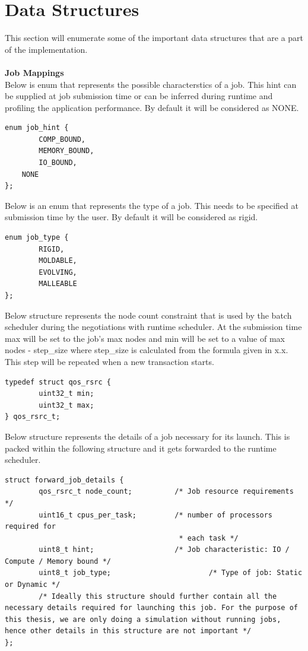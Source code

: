 \section{Data Structures}
This section will enumerate some of the important data structures that are a part of the implementation.\\ \\
\lstset{breaklines=true}
\textbf{Job Mappings}\\
Below is enum that represents the possible characterstics of a job. This hint can be supplied at job submission time or can be inferred during runtime and profiling the application performance. By default it will be considered as NONE.
\begin{lstlisting}[mathescape]
enum job_hint {
        COMP_BOUND,
        MEMORY_BOUND,
        IO_BOUND,
	NONE
};
\end{lstlisting}
Below is an enum that represents the type of a job. This needs to be specified at submission time by the user. By default it will be considered as rigid.
\begin{lstlisting}[mathescape]
enum job_type {
        RIGID,
        MOLDABLE,
        EVOLVING,
        MALLEABLE
};
\end{lstlisting}
Below structure represents the node count constraint that is used by the batch scheduler during the negotiations with runtime scheduler. At the submission time max will be set to the job's max nodes and min will be set to a value of max nodes - step\_size where step\_size is calculated from the formula given in x.x. This step will be repeated when a new transaction starts.
\begin{lstlisting}[mathescape]
typedef struct qos_rsrc {   
        uint32_t min;
        uint32_t max;
} qos_rsrc_t;
\end{lstlisting}
Below structure represents the details of a job necessary for its launch. This is packed within the following structure and it gets forwarded to the runtime scheduler.
\begin{lstlisting}[mathescape]
struct forward_job_details {
        qos_rsrc_t node_count;          /* Job resource requirements */
        uint16_t cpus_per_task;         /* number of processors required for
                                         * each task */
        uint8_t hint;                   /* Job characteristic: IO / Compute / Memory bound */
        uint8_t job_type;                       /* Type of job: Static or Dynamic */
        /* Ideally this structure should further contain all the necessary details required for launching this job. For the purpose of this thesis, we are only doing a simulation without running jobs, hence other details in this structure are not important */
};
\end{lstlisting}
